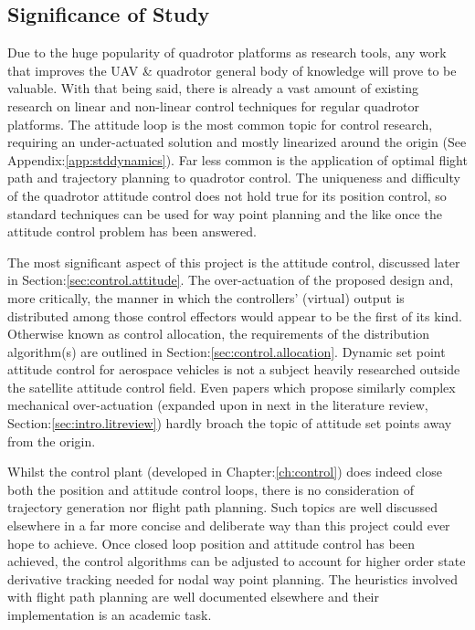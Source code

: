 \subsection{Significance of Study}
\label{subsec:intro.foreword.significance}
Due to the huge popularity of quadrotor platforms as research tools, any work that improves the UAV \& quadrotor general body of knowledge will prove to be valuable. With that being said, there is already a vast amount of existing research on linear and non-linear control techniques for regular quadrotor platforms. The attitude loop is the most common topic for control research, requiring an under-actuated solution and mostly linearized around the origin (See Appendix:\ref{app:stddynamics}). Far less common is the application of optimal flight path and trajectory planning to quadrotor control. The uniqueness and difficulty of the quadrotor attitude control does not hold true for its position control, so standard techniques can be used for way point planning and the like once the attitude control problem has been answered.
\par
The most significant aspect of this project is the attitude control, discussed later in Section:\ref{sec:control.attitude}. The over-actuation of the proposed design and, more critically, the manner in which the controllers' (virtual) output is distributed among those control effectors would appear to be the first of its kind. Otherwise known as control allocation, the requirements of the distribution algorithm(s) are outlined in Section:\ref{sec:control.allocation}. Dynamic set point attitude control for aerospace vehicles is not a subject heavily researched outside the satellite attitude control field. Even papers which propose similarly complex mechanical over-actuation (expanded upon in next in the literature review, Section:\ref{sec:intro.litreview}) hardly broach the topic of attitude set points away from the origin.
\par
Whilst the control plant (developed in Chapter:\ref{ch:control}) does indeed close both the position and attitude control loops, there is no consideration of trajectory generation nor flight path planning. Such topics are well discussed elsewhere in a far more concise and deliberate way than this project could ever hope to achieve. Once closed loop position and attitude control has been achieved, the control algorithms can be adjusted to account for higher order state derivative tracking needed for nodal way point planning. The heuristics involved with flight path planning are well documented elsewhere and their implementation is an academic task.
